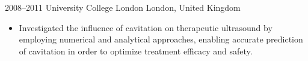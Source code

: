 \documentclass[english, print]{cv-style-wide}
\begin{document}
\begin{entrylist}
\entry
  {2008--2011}
  {University College London}
  {London, United Kingdom}
  {
  	\begin{itemize}
      \item Investigated the influence of cavitation on therapeutic ultrasound by employing numerical and analytical approaches, enabling accurate prediction of cavitation in order to optimize treatment efficacy and safety.
    \end{itemize}}

\end{entrylist}


\vspace{-0.2cm}
\end{document}
